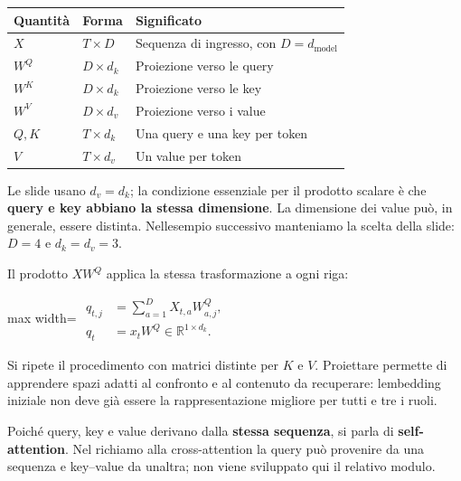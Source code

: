 \documentclass[11pt,a4paper,oneside,openany]{book}
\begin{document}
\begin{longtable}[]{@{}lll@{}}
\toprule\noalign{}
Quantità & Forma & Significato \\
\midrule\noalign{}
\endhead
\bottomrule\noalign{}
\endlastfoot
\(X\) & \(T\times D\) & Sequenza di ingresso, con \(D=d_{\mathrm{model}}\) \\
\(W^Q\) & \(D\times d_k\) & Proiezione verso le query \\
\(W^K\) & \(D\times d_k\) & Proiezione verso le key \\
\(W^V\) & \(D\times d_v\) & Proiezione verso i value \\
\(Q,K\) & \(T\times d_k\) & Una query e una key per token \\
\(V\) & \(T\times d_v\) & Un value per token \\
\end{longtable}

Le slide usano \(d_v=d_k\); la condizione essenziale per il prodotto scalare è che \textbf{query e key abbiano la stessa dimensione}. La dimensione dei value può, in generale, essere distinta. Nell\textquotesingle esempio successivo manteniamo la scelta della slide: \(D=4\) e \(d_k=d_v=3\).

Il prodotto \(XW^Q\) applica la stessa trasformazione a ogni riga:

\begin{center}
\begin{adjustbox}{max width=\linewidth}
$\displaystyle 
\begin{aligned}
q_{t,j}&=\sum_{a=1}^{D}X_{t,a}W^Q_{a,j},\\
q_t&=x_tW^Q\in\mathbb R^{1\times d_k}.
\end{aligned}
$
\end{adjustbox}
\end{center}

Si ripete il procedimento con matrici distinte per \(K\) e \(V\). Proiettare permette di apprendere spazi adatti al confronto e al contenuto da recuperare: l\textquotesingle embedding iniziale non deve già essere la rappresentazione migliore per tutti e tre i ruoli.

Poiché query, key e value derivano dalla \textbf{stessa sequenza}, si parla di \textbf{self-attention}. Nel richiamo alla cross-attention la query può provenire da una sequenza e key--value da un\textquotesingle altra; non viene sviluppato qui il relativo modulo.
\end{document}
